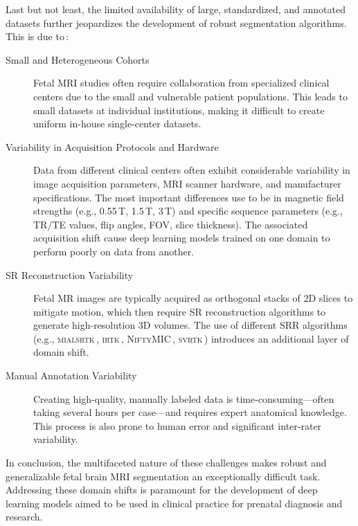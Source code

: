 Last but not least, the limited availability of large, standardized, and annotated datasets further jeopardizes the development of robust segmentation algorithms. This is due to\,\cite{FeTA2024_paper,FeTA2021_review, Ciceri2023}:
\begin{description}
    \item[Small and Heterogeneous Cohorts] Fetal MRI studies often require collaboration from specialized clinical centers due to the small and vulnerable patient populations. This leads to small datasets at individual institutions, making it difficult to create uniform in-house single-center datasets.
    \item[Variability in Acquisition Protocols and Hardware] Data from different clinical centers often exhibit considerable variability in image acquisition parameters, MRI scanner hardware, and manufacturer specifications. The most important differences use to be in magnetic field strengths (e.g., 0.55\,T, 1.5\,T, 3\,T) and specific sequence parameters (e.g., TR/TE values, flip angles, FOV, slice thickness). The associated acquisition shift cause deep learning models trained on one domain to perform poorly on data from another.
    \item[SR Reconstruction Variability] Fetal MR images are typically acquired as orthogonal stacks of 2D slices to mitigate motion, which then require SR reconstruction algorithms to generate high-resolution 3D volumes. The use of different SRR algorithms (e.g., \textsc{mialsrtk}\,\cite{Tourbier2015, MIALSRTK}, \textsc{irtk}\,\cite{Kuklisova2012, irtk-simple}, \textsc{NiftyMIC}\,\cite{Ebner2020}, \textsc{svrtk}\,\cite{Uus2022}) introduces an additional layer of domain shift.
    \item[Manual Annotation Variability] Creating high-quality, manually labeled data is time-consuming---often taking several hours per case---and requires expert anatomical knowledge. This process is also prone to human error and significant inter-rater variability.
\end{description}

In conclusion, the multifaceted nature of these challenges makes robust and generalizable fetal brain MRI segmentation an exceptionally difficult task. Addressing these domain shifts is paramount for the development of deep learning models aimed to be used in clinical practice for prenatal diagnosis and research.
